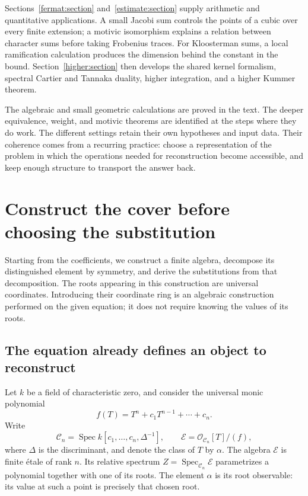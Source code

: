 \documentclass[11pt]{article}
\theoremstyle{remark}
\newcommand{\Spec}{\operatorname{Spec}}
\begin{document}
Sections~\ref{fermat:section} and~\ref{estimate:section} supply arithmetic and quantitative applications. A small Jacobi sum controls the points of a cubic over every finite extension; a motivic isomorphism explains a relation between character sums before taking Frobenius traces. For Kloosterman sums, a local ramification calculation produces the dimension behind the constant in the bound. Section~\ref{higher:section} then develops the shared kernel formalism, spectral Cartier and Tannaka duality, higher integration, and a higher Kummer theorem.

The algebraic and small geometric calculations are proved in the text. The deeper equivalence, weight, and motivic theorems are identified at the steps where they do work. The different settings retain their own hypotheses and input data. Their coherence comes from a recurring practice: choose a representation of the problem in which the operations needed for reconstruction become accessible, and keep enough structure to transport the answer back.

\section{Construct the cover before choosing the substitution}
\label{cover:section}

Starting from the coefficients, we construct a finite algebra, decompose its distinguished element by symmetry, and derive the substitutions from that decomposition. The roots appearing in this construction are universal coordinates. Introducing their coordinate ring is an algebraic construction performed on the given equation; it does not require knowing the values of its roots.

\subsection{The equation already defines an object to reconstruct}

Let \(k\) be a field of characteristic zero, and consider the universal monic polynomial
\[
f(T)=T^n+c_1T^{n-1}+\cdots+c_n.
\]
Write
\[
\mathcal C_n
=\Spec k[c_1,\ldots,c_n,\Delta^{-1}],
\qquad
\mathcal E=\mathcal O_{\mathcal C_n}[T]/(f),
\]
where \(\Delta\) is the discriminant, and denote the class of \(T\) by \(\alpha\).
The algebra \(\mathcal E\) is finite \'etale of rank \(n\). Its relative spectrum
\(Z=\Spec_{\mathcal C_n}\mathcal E\) parametrizes a polynomial together with one of its roots. The element \(\alpha\) is its root observable: its value at such a point is precisely that chosen root.
\end{document}
